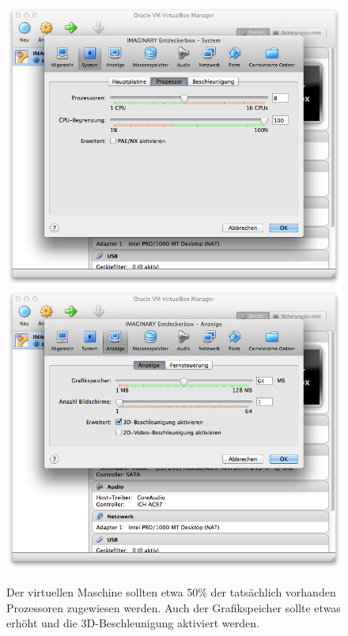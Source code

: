 \documentclass[a4paper,10pt,BCOR=0mm,DIV=14]{scrartcl}
\def\gfxscale{0.27}
\begin{document}
\begin{figure}[h]
\centering\includegraphics[scale=\gfxscale]{VBox60}
\qquad\includegraphics[scale=\gfxscale]{VBox61}
\caption{Der virtuellen Maschine sollten etwa 50\% der tatsächlich vorhanden Prozessoren zugewiesen werden. Auch der Grafikspeicher sollte etwas erhöht und die 3D-Beschleunigung aktiviert werden.}
\label{VBox60}
\end{figure}
\end{document}
